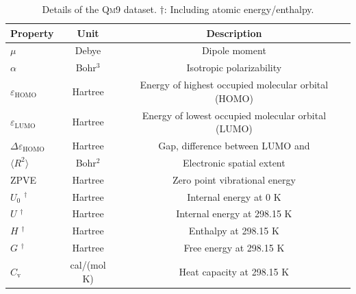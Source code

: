 \documentclass[letterpaper]{article}
\theoremstyle{definition}
\begin{document}

\begin{table}
	\caption{%
	Details of the  \textsc{Qm9} dataset. $\dagger$: Including atomic energy/enthalpy.
	}%
	\label{fig:qm9_details}
	\renewcommand{\arraystretch}{1.0}
	\centering
	\begin{tabular}{lcc}
		\toprule
		\textbf{Property} & \textbf{Unit} & \textbf{Description} \\
		\midrule
		$\mu$                       & Debye   &     Dipole moment  \\
		$\alpha$                    &  Bohr$^3$   &    Isotropic polarizability \\
		$\varepsilon_{\text{HOMO}}$ & Hartree &     Energy of highest occupied molecular
		orbital (HOMO)  \\
		$\varepsilon_{\text{LUMO}}$ &  Hartree  &    Energy of lowest occupied molecular
		orbital (LUMO)     \\
		$\Delta\varepsilon_{\text{HOMO}}$         &  Hartree  &    Gap, difference between LUMO and \\
		$\langle R^2 \rangle$       &Bohr$^2$  &    Electronic spatial extent                \\
		\textsc{ZPVE}               &Hartree  &    Zero point vibrational energy    \\
		$U_0$    $^\dagger$                  &Hartree &     Internal energy at 0 K  \\
		$U$      $^\dagger$                   &Hartree   &   Internal energy at 298.15 K  \\
		$H$      $^\dagger$                   &Hartree     & Enthalpy at 298.15 K  \\
		$G$      $^\dagger$                   &Hartree     & Free energy at 298.15 K
		 \\
		$C_{\text{v}}$              & cal/(mol K)&  Heat capacity at 298.15 K   \\
		\bottomrule
	\end{tabular}
\end{table}
\end{document}
